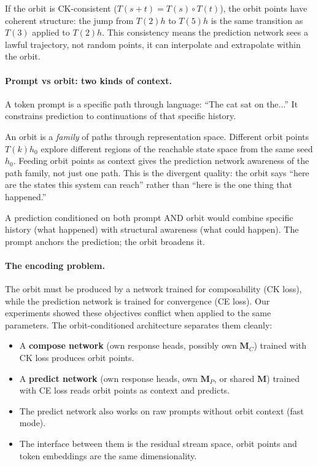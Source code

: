 \documentclass[11pt, a4paper]{article}
\newcommand{\M}{\mathbf{M}}
\theoremstyle{plain}
\theoremstyle{definition}
\theoremstyle{remark}
\begin{document}
If the orbit is CK-consistent ($T(s{+}t) = T(s) \circ T(t)$), the orbit points have coherent structure: the jump from $T(2)h$ to $T(5)h$ is the same transition as $T(3)$ applied to $T(2)h$.
This consistency means the prediction network sees a lawful trajectory, not random points, it can interpolate and extrapolate within the orbit.

\paragraph{Prompt vs orbit: two kinds of context.}
A token prompt is a specific path through language: ``The cat sat on the...''
It constrains prediction to continuations of that specific history.

An orbit is a \emph{family} of paths through representation space.
Different orbit points $T(k)h_0$ explore different regions of the reachable state space from the same seed $h_0$.
Feeding orbit points as context gives the prediction network awareness of the path family, not just one path.
This is the divergent quality: the orbit says ``here are the states this system can reach'' rather than ``here is the one thing that happened.''

A prediction conditioned on both prompt AND orbit would combine specific history (what happened) with structural awareness (what could happen).
The prompt anchors the prediction; the orbit broadens it.

\paragraph{The encoding problem.}
The orbit must be produced by a network trained for composability (CK loss), while the prediction network is trained for convergence (CE loss).
Our experiments showed these objectives conflict when applied to the same parameters.
The orbit-conditioned architecture separates them cleanly:
\begin{itemize}[nosep]
    \item A \textbf{compose network} (own response heads, possibly own $\M_C$) trained with CK loss produces orbit points.
    \item A \textbf{predict network} (own response heads, own $\M_P$, or shared $\M$) trained with CE loss reads orbit points as context and predicts.
    \item The predict network also works on raw prompts without orbit context (fast mode).
    \item The interface between them is the residual stream space, orbit points and token embeddings are the same dimensionality.
\end{itemize}
\end{document}
